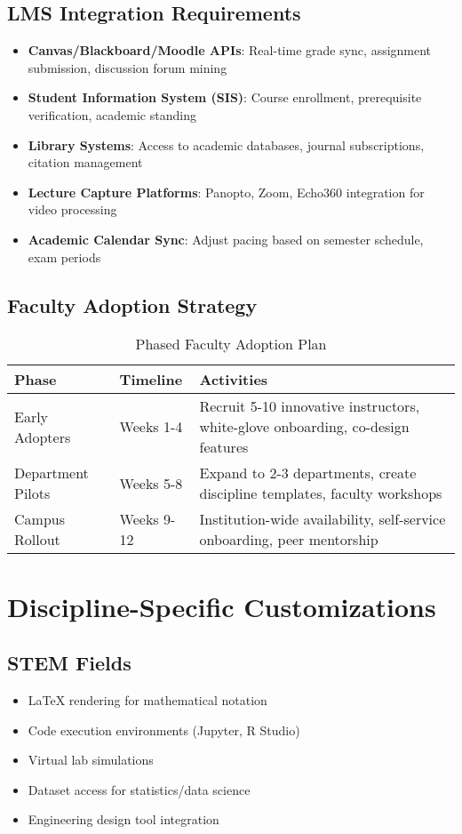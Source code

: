\documentclass[11pt,a4paper]{report}
\begin{document}
\subsection{LMS Integration Requirements}
\begin{itemize}
    \item \textbf{Canvas/Blackboard/Moodle APIs}: Real-time grade sync, assignment submission, discussion forum mining
    \item \textbf{Student Information System (SIS)}: Course enrollment, prerequisite verification, academic standing
    \item \textbf{Library Systems}: Access to academic databases, journal subscriptions, citation management
    \item \textbf{Lecture Capture Platforms}: Panopto, Zoom, Echo360 integration for video processing
    \item \textbf{Academic Calendar Sync}: Adjust pacing based on semester schedule, exam periods
\end{itemize}

\subsection{Faculty Adoption Strategy}

\begin{table}[H]
\centering
\caption{Phased Faculty Adoption Plan}
\begin{tabular}{llp{6cm}}
\toprule
\textbf{Phase} & \textbf{Timeline} & \textbf{Activities} \\
\midrule
Early Adopters & Weeks 1-4 & Recruit 5-10 innovative instructors, white-glove onboarding, co-design features \\
Department Pilots & Weeks 5-8 & Expand to 2-3 departments, create discipline templates, faculty workshops \\
Campus Rollout & Weeks 9-12 & Institution-wide availability, self-service onboarding, peer mentorship \\
\bottomrule
\end{tabular}
\end{table}

\section{Discipline-Specific Customizations}

\subsection{STEM Fields}
\begin{itemize}
    \item LaTeX rendering for mathematical notation
    \item Code execution environments (Jupyter, R Studio)
    \item Virtual lab simulations
    \item Dataset access for statistics/data science
    \item Engineering design tool integration
\end{itemize}
\end{document}

